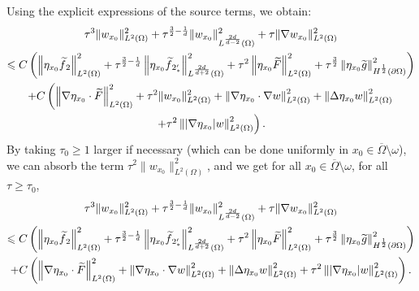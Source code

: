 \documentclass[10pt]{amsart}
\theoremstyle{definition}\newtheorem{defi}[theo]{Definition}\newtheorem{rema}[theo]{Remark}\newtheorem{exam}[theo]{Example}\newtheorem{exem}[theo]{Example}\newtheorem{nota}[theo]{Notation}
\newcommand{\norm}[1]{\left\Vert#1\right\Vert}
\renewcommand{\leq}{\leqslant}
\renewcommand{\geq}{\geqslant}
\renewcommand{\tilde}{\widetilde}
\let\oldtilde\tilde
\renewcommand*{\tilde}[1]{\mathchoice{\widetilde{#1}}{\widetilde{#1}}{\oldtilde{#1}}{\oldtilde{#1}}}
\begin{document}
Using the explicit expressions of the source terms, we obtain:
\begin{multline*}
\tau^{3} \| w_{x_0} \|_{L^2(\Omega)}^2 +
\tau^{\frac{3}{2} - \frac{1}{d}} \| w_{x_0} \|_{L^{\frac{2d}{d-2}}(\Omega)}^2 +
\tau \| \nabla w_{x_0} \|_{L^2(\Omega)}^2
\\
\leq C
\left(
\norm{\eta_{x_0} \tilde f_{2}}_{L^2(\Omega)} ^2 +
\tau^{\frac{3}{2}-\frac{1}{d}} \norm{ \eta_{x_0} \tilde f_{2_*'}}_{L^{\frac{2d}{d+2}}(\Omega)}^2 +
\tau^2 \norm{\eta_{x_0} \tilde F}_{L^2(\Omega)}^2 +
\tau^{\frac{3}{2}} \norm{\eta_{x_0} \tilde g}_{H^{\frac{1}{2}}(\partial\Omega)}^2
\right)
\\
+ C
\left(\norm{\nabla \eta_{x_0} \cdot \tilde F }_{L^2(\Omega)}^2 +
\tau^2 \| w_{x_0} \|_{L^2(\Omega)}^2 +
\norm{ \nabla \eta_{x_0} \cdot \nabla w }_{L^2(\Omega)}^2 +
\norm{\Delta \eta_{x_0} w}_{L^2(\Omega)}^2\right.\\ \left. +
\tau^2 \norm{ |\nabla \eta_{x_0}| w }_{L^2(\Omega)}^2
\right).
\end{multline*}
By taking $\tau_0\geq 1$ larger if necessary (which can be done uniformly in $x_0 \in \overline\Omega\setminus\omega$), we can absorb the term $\tau^2 \| w_{x_0} \|_{L^2(\Omega)}^2$, and we get for all $x_0 \in \overline\Omega\setminus\omega$, for all $\tau \geq \tau_0$,
\begin{multline*}
\tau^{3} \| w_{x_0} \|_{L^2(\Omega)}^2 +
\tau^{\frac{3}{2}-\frac{1}{d}} \| w_{x_0} \|_{L^{\frac{2d}{d-2}}(\Omega)}^2 +
\tau \| \nabla w_{x_0} \|_{L^2(\Omega)}^2
\\
\leq C
\left(
\norm{\eta_{x_0} \tilde f_{2}}_{L^2(\Omega)} ^2 +
\tau^{\frac{3}{2}-\frac{1}{d}} \norm{\eta_{x_0} \tilde f_{2_*'}}_{L^{\frac{2d}{d+2}}(\Omega)}^2 +
\tau^2 \norm{\eta_{x_0} \tilde F}_{L^2(\Omega)}^2 +
\tau^{\frac{3}{2}} \norm{\eta_{x_0} \tilde g}_{H^{\frac{1}{2}}(\partial\Omega)}^2
\right)
\\
+ C
\left(\norm{ \nabla \eta_{x_0} \cdot \tilde F }_{L^2(\Omega)}^2 +
\norm{\nabla \eta_{x_0} \cdot \nabla w}_{L^2(\Omega)}^2 +
\norm{\Delta \eta_{x_0} w}_{L^2(\Omega)}^2 +
\tau^2 \norm{ |\nabla \eta_{x_0}| w}_{L^2(\Omega)}^2
\right).
\end{multline*}
\end{document}
